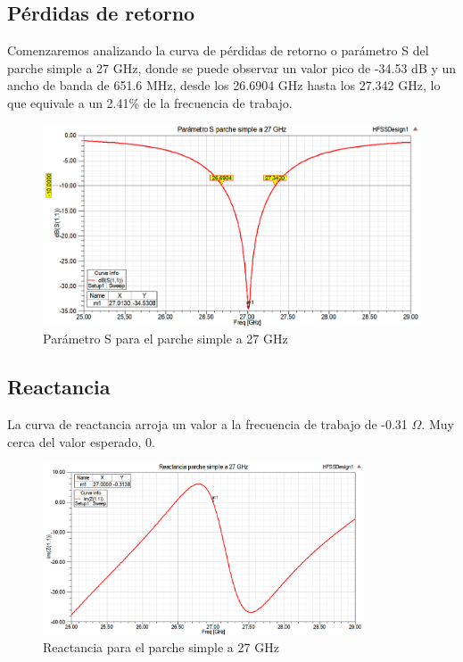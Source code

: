 \subsection{Pérdidas de retorno}
\par Comenzaremos analizando la curva de pérdidas de retorno o parámetro S del parche simple a 27 GHz, donde se puede observar un valor pico de -34.53 dB y un ancho de banda de 651.6 MHz, desde los 26.6904 GHz hasta los 27.342 GHz, lo que equivale a un 2.41\% de la frecuencia de trabajo.
\\
\begin{figure}[H]
    \centering
        \includegraphics[width=\textwidth]{archivos/analisis/1x13/1}
        \caption{Parámetro S para el parche simple a 27 GHz}
        \label{fig:s1x13}
\end{figure}

\subsection{Reactancia}
\par La curva de reactancia arroja un valor a la frecuencia de trabajo de -0.31 $\Omega$. Muy cerca del valor esperado, 0.
\\
\begin{figure}[H]
    \centering
        \includegraphics[width=0.85\textwidth]{archivos/analisis/1x13/2}
        \caption{Reactancia para el parche simple a 27 GHz}
        \label{fig:react1x13}
\end{figure}


